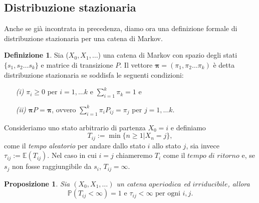 \documentclass{article}
\newtheorem{proposition}[theorem]{Proposizione}
\theoremstyle{definition}
\theoremstyle{definition}
\newtheorem{definition}[theorem]{Definizione}
\theoremstyle{remark}
\begin{document}
\subsection{Distribuzione stazionaria}
Anche se già incontrata in precedenza, diamo ora  una definizione formale di distribuzione stazionaria per una catena di Markov.
\begin{definition}
    Sia ($X_0,X_1,\dots$) una catena di Markov con spazio degli stati $\{s_1,s_2\dots s_k\}$ e matrice di transizione $P$. Il vettore
    $\boldsymbol{\pi} = (\pi_1,\pi_2\dots\pi_k)$ è detta distribuzione stazionaria se soddisfa le seguenti condizioni:
    \begin{itemize}
        \item [\textit{(i)}] $\pi_i\ge 0$ per $i = 1,\dots k$ e $\sum_{i=1}^k \pi_k = 1$ e
        \item [\textit{(ii)}]$\boldsymbol{\pi}P = \boldsymbol{\pi}$, ovvero $\sum_{i=1}^k \pi_i P_{ij} = \pi_j$ per $j =1,\dots k$.
    \end{itemize}
\end{definition}
Consideriamo uno stato arbitrario di partenza $X_0= i$ e definiamo $$T_{ij} :=\min\{n\ge 1| X_n = j\},$$ come il \textit{tempo aleatorio} per andare dallo stato
$i$ allo stato $j$, sia invece $\tau_{ij} := \mathbb{E}(T_{ij})$. Nel caso in cui $i=j$ chiameremo $T_i$  come il $tempo$ $di$ $ritorno$ e, se $s_j$ non fosse raggiungibile da $s_i$, $T_{ij} = \infty$.
\begin{proposition}
    Sia $(X_0,X_1,\dots)$ un catena $aperiodica$ ed $irriducibile$, allora $$\mathbb{P}(T_{ij}<\infty) =1 \text{ e } \tau_{ij}<\infty\text { per ogni $i,j$}.$$
\end{proposition}
\end{document}
